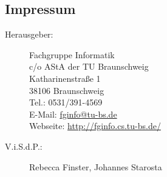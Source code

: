 \newpage
\subsection{Impressum}
\label{impressum}
\begin{description}
\item[Herausgeber:]
	Fachgruppe Informatik\\
	c/o AStA der TU Braunschweig\\
	Katharinenstraße 1\\
	38106 Braunschweig\\
	Tel.: 0531/391-4569\\
	E-Mail: \url{fginfo@tu-bs.de}\\
	Webseite: \url{http://fginfo.cs.tu-bs.de/}
\item[V.i.S.d.P.:]  %
  Rebecca Finster, Johannes Starosta
\end{description}
